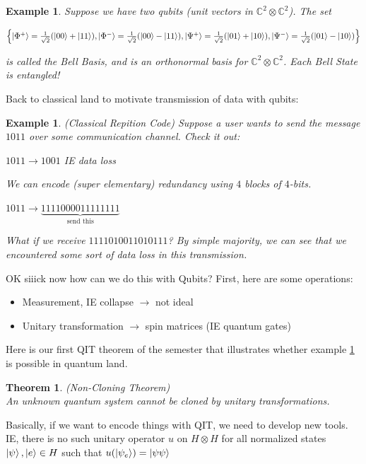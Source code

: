 \documentclass[12pt]{article}
\theoremstyle{plain}
\newtheorem{theorem}[lemma]{Theorem}
\theoremstyle{nonumberplain}
\theoremstyle{plain}
\newtheorem{example}[lemma]{Example}
\theoremstyle{nonumberplain}
\newcommand\1{{\bf 1}}
\newcommand{\C}{\mathbb{C}} %
\newcommand{\<}{\left\langle}
\renewcommand{\>}{\right\rangle}
\newcommand{\lb}{\left\{}
\newcommand{\rb}{\right\}}
\begin{document}
\begin{example}
Suppose we have two qubits (unit vectors in $\C^2\otimes\C^2$). 
The set 
\begin{center}
$\lb\ket{\Phi^{+}}=\frac{1}{\sqrt{2}}(\ket{00}+\ket{11}),\ket{\Phi^{-}}=\frac{1}{\sqrt{2}}(\ket{00}-\ket{11}),\ket{\Psi^{+}}=\frac{1}{\sqrt{2}}(\ket{01}+\ket{10}),\ket{\Psi^{-}}=\frac{1}{\sqrt{2}}(\ket{01}-\ket{10})\rb$
\end{center}
is called the Bell Basis, and is an orthonormal basis for $\C^2\otimes\C^2$. Each Bell State is entangled!
\end{example}
Back to classical land to motivate transmission of data with qubits:
\begin{example}\label{ex:crc}
(Classical Repition Code) Suppose a user wants to send the message $1011$ over some communication channel. Check it out: 
\begin{center}
	$1011\longrightarrow 1001$ IE data loss
\end{center}
We can encode (super elementary) redundancy using $4$ blocks of $4$-bits.
\begin{center}
	$1011\longrightarrow \underbrace{\textstyle 1111000011111111}_{\text{send this}}$
\end{center}
What if we receive $1111010011010111$? By simple majority, we can see that we encountered some sort of data loss in this transmission.
\end{example}
OK siiick now how can we do this with Qubits? First, here are some operations:
\begin{itemize}
	\item Measurement, IE collapse $\longrightarrow$ not ideal
	\item Unitary transformation $\longrightarrow$ spin matrices (IE quantum gates)
\end{itemize}
Here is our first QIT theorem of the semester that illustrates whether example \ref{ex:crc} is possible in quantum land.
\begin{theorem}
	(Non-Cloning Theorem)\\
	An unknown quantum system cannot be cloned by unitary transformations.
\end{theorem}
Basically, if we want to encode things with QIT, we need to develop new tools. IE, there is no such unitary operator $u$ on $H\otimes H$ for all normalized states $\ket{\psi},\ket{e}\in H$ such that
$u(\ket{\psi_e})=\ket{\psi\psi}$

\end{document}

